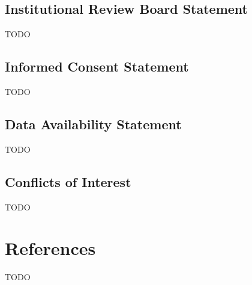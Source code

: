 \documentclass[12pt]{article}
\begin{document}
\subsection*{Institutional Review Board Statement}
TODO

\subsection*{Informed Consent Statement}
TODO

\subsection*{Data Availability Statement}
TODO

\subsection*{Conflicts of Interest}
TODO

\section*{References}
TODO
\end{document}
